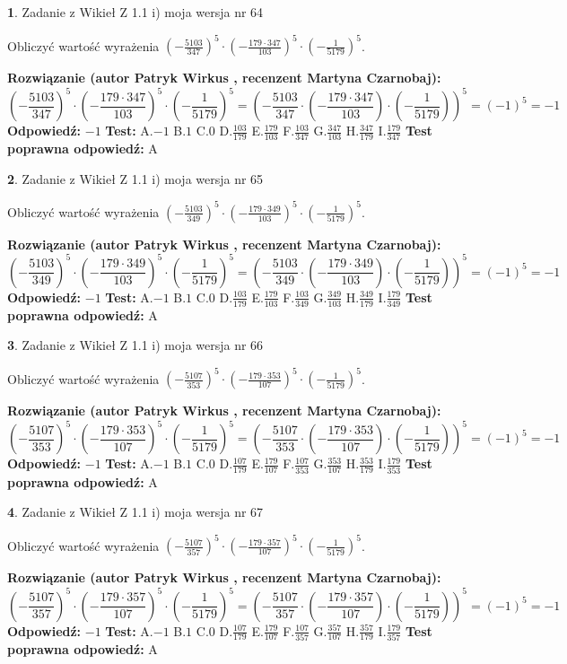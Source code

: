 \documentclass[12pt, a4paper]{article}
\theoremstyle{definition} %
\newtheorem{zad}{}
\newcommand{\zadStart}[1]{\begin{zad}#1\newline}
\newcommand{\zadStop}{\end{zad}}
\newcommand{\rozwStart}[2]{\noindent \textbf{Rozwiązanie (autor #1 , recenzent #2): }\newline}
\newcommand{\rozwStop}{\newline}
\newcommand{\odpStart}{\noindent \textbf{Odpowiedź:}\newline}
\newcommand{\odpStop}{\newline}
\newcommand{\testStart}{\noindent \textbf{Test:}\newline}
\newcommand{\testStop}{\newline}
\newcommand{\kluczStart}{\noindent \textbf{Test poprawna odpowiedź:}\newline}
\newcommand{\kluczStop}{\newline}
\begin{document}
\zadStart{Zadanie z Wikieł Z 1.1 i) moja wersja nr 64}

Obliczyć wartość wyrażenia $(-\frac{5103}{347})^{5} \cdot (-\frac{179 \cdot 347}{103})^{5} \cdot (-\frac{1}{5179})^{5}$.
\zadStop
\rozwStart{Patryk Wirkus}{Martyna Czarnobaj}
$$(-\frac{5103}{347})^{5} \cdot (-\frac{179 \cdot 347}{103})^{5} \cdot (-\frac{1}{5179})^{5} = (-\frac{5103}{347} \cdot (-\frac{179 \cdot 347}{103}) \cdot (-\frac{1}{5179}))^{5} = (-1)^{5} = -1$$
\rozwStop
\odpStart
$-1$
\odpStop
\testStart
A.$-1$ B.$1$ C.$0$ D.$\frac{103}{179}$ E.$\frac{179}{103}$
F.$\frac{103}{347}$ G.$\frac{347}{103}$
H.$\frac{347}{179}$
I.$\frac{179}{347}$
\testStop
\kluczStart
A
\kluczStop



\zadStart{Zadanie z Wikieł Z 1.1 i) moja wersja nr 65}

Obliczyć wartość wyrażenia $(-\frac{5103}{349})^{5} \cdot (-\frac{179 \cdot 349}{103})^{5} \cdot (-\frac{1}{5179})^{5}$.
\zadStop
\rozwStart{Patryk Wirkus}{Martyna Czarnobaj}
$$(-\frac{5103}{349})^{5} \cdot (-\frac{179 \cdot 349}{103})^{5} \cdot (-\frac{1}{5179})^{5} = (-\frac{5103}{349} \cdot (-\frac{179 \cdot 349}{103}) \cdot (-\frac{1}{5179}))^{5} = (-1)^{5} = -1$$
\rozwStop
\odpStart
$-1$
\odpStop
\testStart
A.$-1$ B.$1$ C.$0$ D.$\frac{103}{179}$ E.$\frac{179}{103}$
F.$\frac{103}{349}$ G.$\frac{349}{103}$
H.$\frac{349}{179}$
I.$\frac{179}{349}$
\testStop
\kluczStart
A
\kluczStop



\zadStart{Zadanie z Wikieł Z 1.1 i) moja wersja nr 66}

Obliczyć wartość wyrażenia $(-\frac{5107}{353})^{5} \cdot (-\frac{179 \cdot 353}{107})^{5} \cdot (-\frac{1}{5179})^{5}$.
\zadStop
\rozwStart{Patryk Wirkus}{Martyna Czarnobaj}
$$(-\frac{5107}{353})^{5} \cdot (-\frac{179 \cdot 353}{107})^{5} \cdot (-\frac{1}{5179})^{5} = (-\frac{5107}{353} \cdot (-\frac{179 \cdot 353}{107}) \cdot (-\frac{1}{5179}))^{5} = (-1)^{5} = -1$$
\rozwStop
\odpStart
$-1$
\odpStop
\testStart
A.$-1$ B.$1$ C.$0$ D.$\frac{107}{179}$ E.$\frac{179}{107}$
F.$\frac{107}{353}$ G.$\frac{353}{107}$
H.$\frac{353}{179}$
I.$\frac{179}{353}$
\testStop
\kluczStart
A
\kluczStop



\zadStart{Zadanie z Wikieł Z 1.1 i) moja wersja nr 67}

Obliczyć wartość wyrażenia $(-\frac{5107}{357})^{5} \cdot (-\frac{179 \cdot 357}{107})^{5} \cdot (-\frac{1}{5179})^{5}$.
\zadStop
\rozwStart{Patryk Wirkus}{Martyna Czarnobaj}
$$(-\frac{5107}{357})^{5} \cdot (-\frac{179 \cdot 357}{107})^{5} \cdot (-\frac{1}{5179})^{5} = (-\frac{5107}{357} \cdot (-\frac{179 \cdot 357}{107}) \cdot (-\frac{1}{5179}))^{5} = (-1)^{5} = -1$$
\rozwStop
\odpStart
$-1$
\odpStop
\testStart
A.$-1$ B.$1$ C.$0$ D.$\frac{107}{179}$ E.$\frac{179}{107}$
F.$\frac{107}{357}$ G.$\frac{357}{107}$
H.$\frac{357}{179}$
I.$\frac{179}{357}$
\testStop
\kluczStart
A
\kluczStop
\end{document}
